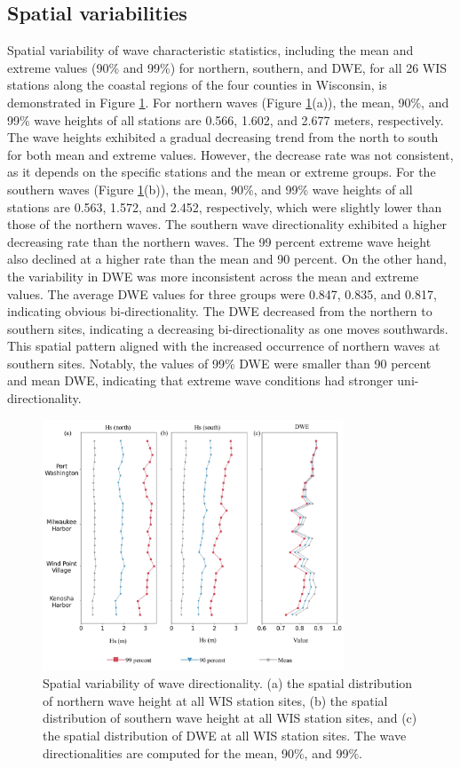 \subsection{Spatial variabilities}
\label{Spatial variabilities}
Spatial variability of wave characteristic statistics, including the mean and extreme values (90\% and 99\%) for northern, southern, and DWE, for all 26 WIS stations along the coastal regions of the four counties in Wisconsin, is demonstrated in Figure \ref{fig:fig3.7}. For northern waves (Figure \ref{fig:fig3.7}(a)), the mean, 90\%, and 99\% wave heights of all stations are 0.566, 1.602, and 2.677 meters, respectively. The wave heights exhibited a gradual decreasing trend from the north to south for both mean and extreme values. However, the decrease rate was not consistent, as it depends on the specific stations and the mean or extreme groups. For the southern waves (Figure \ref{fig:fig3.7}(b)), the mean, 90\%, and 99\% wave heights of all stations are 0.563, 1.572, and 2.452, respectively, which were slightly lower than those of the northern waves. The southern wave directionality exhibited a higher decreasing rate than the northern waves. The 99 percent extreme wave height also declined at a higher rate than the mean and 90 percent. On the other hand, the variability in DWE was more inconsistent across the mean and extreme values. The average DWE values for three groups were 0.847, 0.835, and 0.817, indicating obvious bi-directionality. The DWE decreased from the northern to southern sites, indicating a decreasing bi-directionality as one moves southwards. This spatial pattern aligned with the increased occurrence of northern waves at southern sites. Notably, the values of 99\% DWE were smaller than 90 percent and mean DWE, indicating that extreme wave conditions had stronger uni-directionality. 

\begin{figure}[htbp]
  \centering
  \includegraphics[width=0.8\textwidth]{chapter3/resources/figure3-7.jpg}
  \caption{Spatial variability of wave directionality. (a) the spatial distribution of northern wave height at all WIS station sites, (b) the spatial distribution of southern wave height at all WIS station sites, and (c) the spatial distribution of DWE at all WIS station sites. The wave directionalities are computed for the mean, 90$\%$, and 99$\%$.}
  \label{fig:fig3.7}
\end{figure}

